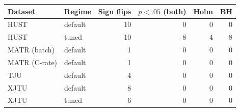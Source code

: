\begin{tabular}{llrrrr}
\toprule
Dataset & Regime & Sign flips & $p<.05$ (both) & Holm & BH \\
\midrule
HUST & default & 10 & 0 & 0 & 0 \\
HUST & tuned & 10 & 8 & 4 & 8 \\
MATR (batch) & default & 1 & 0 & 0 & 0 \\
MATR (C-rate) & default & 1 & 0 & 0 & 0 \\
TJU & default & 4 & 0 & 0 & 0 \\
XJTU & default & 8 & 0 & 0 & 0 \\
XJTU & tuned & 6 & 0 & 0 & 0 \\
\bottomrule
\end{tabular}
